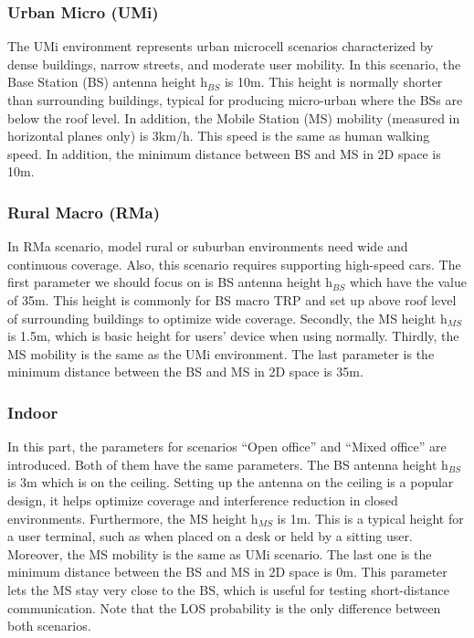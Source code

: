 \documentclass{article} %
\begin{document}
\subsubsection{Urban Micro (UMi)}
The UMi environment represents urban microcell scenarios characterized by dense buildings, narrow streets, and moderate user mobility. In this scenario, the Base Station (BS) antenna height $\mathrm{h}_{BS}$ is 10m. This height is normally shorter than surrounding buildings, typical for producing micro-urban where the BSs are below the roof level. In addition, the Mobile Station (MS) mobility (measured in horizontal planes only) is 3km/h. This speed is the same as human walking speed. In addition, the minimum distance between BS and MS in 2D space is 10m. \cite{ETSI5G}

\subsubsection{Rural Macro (RMa)}
In RMa scenario, model rural or suburban environments need wide and continuous coverage. Also, this scenario requires supporting high-speed cars. The first parameter we should focus on is BS antenna height $\mathrm{h}_{BS}$ which have the value of 35m. This height is commonly for BS macro TRP and set up above roof level of surrounding buildings to optimize wide coverage. Secondly, the MS height $\mathrm{h}_{MS}$ is 1.5m, which is basic height for users’ device when using normally. Thirdly, the MS mobility is the same as the UMi environment. The last parameter is the minimum distance between the BS and MS in 2D space is 35m. \cite{ETSI5G}

\subsubsection{Indoor}
In this part, the parameters for scenarios “Open office” and “Mixed office” are introduced. Both of them have the same parameters. The BS antenna height $\mathrm{h}_{BS}$ is 3m which is on the ceiling. Setting up the antenna on the ceiling is a popular design, it helps optimize coverage and interference reduction in closed environments. Furthermore, the MS height $\mathrm{h}_{MS}$ is 1m. This is a typical height for a user terminal, such as when placed on a desk or held by a sitting user. Moreover, the MS mobility is the same as UMi scenario. The last one is the minimum distance between the BS and MS in 2D space is 0m. This parameter lets the MS stay very close to the BS, which is useful for testing short-distance communication. Note that the LOS probability is the only difference between both scenarios. \cite{ETSI5G}
\end{document}
